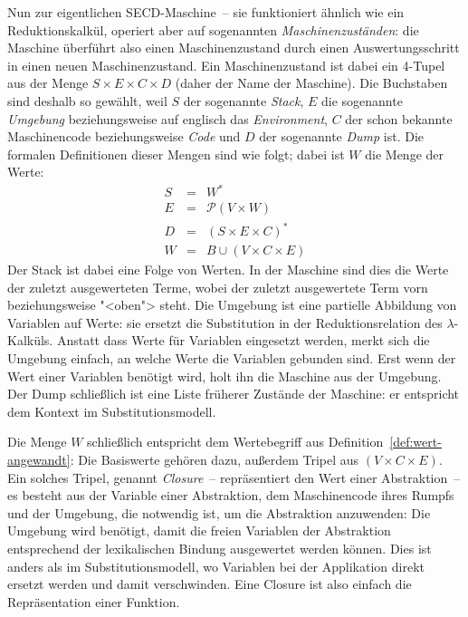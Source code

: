 Nun zur eigentlichen SECD-Maschine~-- sie funktioniert ähnlich wie ein
Reduktionskalkül, operiert aber auf sogenannten
\textit{Maschinenzuständen}: die Maschine überführt also einen
Maschinenzustand durch einen Auswertungsschritt in einen neuen
Maschinenzustand.  Ein Maschinenzustand ist dabei ein 4-Tupel aus der
Menge $S\times E\times C\times D$ (daher der Name der Maschine).  Die
Buchstaben sind deshalb so gewählt, weil $S$ der sogenannte
\textit{Stack}, $E$ die sogenannte
\textit{Umgebung} beziehungsweise auf englisch das
\textit{Environment}, $C$ der schon bekannte
Maschinencode beziehungsweise \textit{Code} und $D$ der
sogenannte \textit{Dump} ist.  Die formalen Definitionen
dieser Mengen sind wie folgt; dabei ist $W$ die Menge der Werte:
%
\begin{eqnarray*}
  S &=& W^\ast\\
  E &=& \mathcal{P}(V\times W)\\
  D &=& (S\times E \times C)^\ast\\
  W &=& B \cup (V\times C\times E)
\end{eqnarray*}
%
Der Stack ist dabei eine Folge von Werten.  In der Maschine sind dies
die Werte der zuletzt ausgewerteten Terme, wobei der zuletzt
ausgewertete Term vorn beziehungsweise "<oben"> steht.  Die Umgebung ist eine
partielle Abbildung von Variablen auf Werte: sie ersetzt die
Substitution in der Reduktionsrelation des $\lambda$-Kalküls.  Anstatt
dass Werte für Variablen eingesetzt werden, merkt sich die Umgebung
einfach, an welche Werte die Variablen gebunden sind.  Erst wenn der
Wert einer Variablen benötigt wird, holt ihn die Maschine aus der
Umgebung.  Der Dump schließlich ist eine Liste früherer Zustände der
Maschine: er entspricht dem Kontext im
Substitutionsmodell.

Die Menge $W$ schließlich entspricht dem Wertebegriff aus
Definition~\ref{def:wert-angewandt}: Die Basiswerte gehören dazu,
außerdem Tripel aus $(V\times C\times E)$.  Ein solches Tripel,
genannt \textit{Closure}~-- repräsentiert den Wert
einer Abstraktion~-- es besteht aus der Variable einer Abstraktion,
dem Maschinencode ihres Rumpfs und der Umgebung, die notwendig ist, um
die Abstraktion anzuwenden: Die Umgebung wird benötigt, damit die
freien Variablen der Abstraktion entsprechend der lexikalischen
Bindung ausgewertet werden können.  Dies
ist anders als im Substitutionsmodell, wo Variablen bei der
Applikation direkt ersetzt werden und damit verschwinden.  Eine
Closure ist also einfach die Repräsentation einer Funktion.

